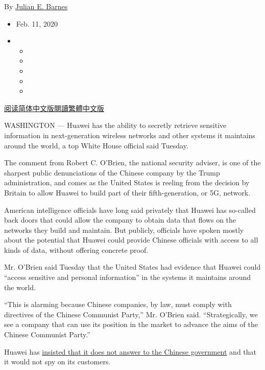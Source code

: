By \href{https://www.nytimes.com/by/julian-e-barnes}{Julian E. Barnes}

\begin{itemize}
\item
  Feb. 11, 2020
\item
  \begin{itemize}
  \item
  \item
  \item
  \item
  \item
  \end{itemize}
\end{itemize}

\href{https://cn.nytimes.com/usa/20200213/white-house-huawei-back-door/}{阅读简体中文版}\href{https://cn.nytimes.com/usa/20200213/white-house-huawei-back-door/zh-hant/}{閱讀繁體中文版}

WASHINGTON --- Huawei has the ability to secretly retrieve sensitive
information in next-generation wireless networks and other systems it
maintains around the world, a top White House official said Tuesday.

The comment from Robert C. O'Brien, the national security adviser, is
one of the sharpest public denunciations of the Chinese company by the
Trump administration, and comes as the United States is reeling from the
decision by Britain to allow Huawei to build part of their
fifth-generation, or 5G, network.

American intelligence officials have long said privately that Huawei has
so-called back doors that could allow the company to obtain data that
flows on the networks they build and maintain. But publicly, officials
have spoken mostly about the potential that Huawei could provide Chinese
officials with access to all kinds of data, without offering concrete
proof.

Mr. O'Brien said Tuesday that the United States had evidence that Huawei
could ``access sensitive and personal information'' in the systems it
maintains around the world.

``This is alarming because Chinese companies, by law, must comply with
directives of the Chinese Communist Party,'' Mr. O'Brien said.
``Strategically, we see a company that can use its position in the
market to advance the aims of the Chinese Communist Party.''

Huawei has
\href{https://www.nytimes.com/2019/01/15/technology/huawei-ren-zhengfei.html}{insisted
that it does not answer to the Chinese government} and that it would not
spy on its customers.

